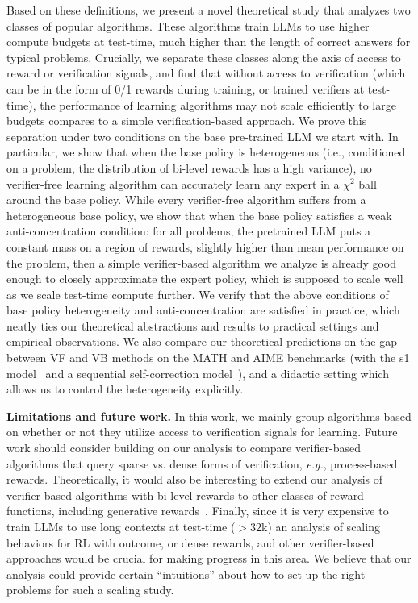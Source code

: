 Based on these definitions, we present a novel theoretical study that analyzes two classes of popular algorithms. These algorithms train LLMs to use higher compute budgets at test-time, much higher than the length of correct answers for typical problems. Crucially, we separate these classes along the axis of access to reward or verification signals, and find that without access to verification (which can be in the form of 0/1 rewards during training, or trained verifiers at test-time), the performance of learning algorithms may not scale efficiently to large budgets compares to a simple verification-based approach. We prove this separation under two conditions on the base pre-trained LLM we start with. In particular, we show that when the base policy is heterogeneous (i.e., conditioned on a problem, the distribution of bi-level rewards has a high variance), no verifier-free learning algorithm can accurately learn any expert in a $\chi^2$ ball around the base policy. While every verifier-free algorithm suffers from a heterogeneous base policy, we show that when the base policy satisfies a weak anti-concentration condition: for all problems, the pretrained LLM puts a constant mass on a region of rewards, slightly higher than mean performance on the problem, then a simple verifier-based algorithm we analyze is already good enough to closely approximate the expert policy, which is supposed to scale well as we scale test-time compute further. We verify that the above conditions of base policy heterogeneity and anti-concentration are satisfied in practice, which neatly ties our theoretical abstractions and results to practical settings and empirical observations. We also  compare our theoretical predictions on the gap between VF and VB methods on the MATH and AIME benchmarks (with the s1 model~\citep{muennighoff2025s1} and a sequential self-correction model~\cite{snell2024scaling}), and a didactic setting which allows us to control the heterogeneity explicitly.

\textbf{Limitations and future work.} In this work, we mainly group algorithms based on whether or not they utilize access to verification signals for learning. Future work should consider building on our analysis to compare verifier-based algorithms that query sparse vs. dense forms of verification, \textit{e.g.}, process-based rewards. Theoretically, it would also be interesting to extend our analysis of verifier-based algorithms with bi-level rewards to other classes of reward functions, including generative rewards~\citep{zhang2024generative}. Finally, since it is very expensive to train LLMs to use long contexts at test-time ($>32$k) an analysis of scaling behaviors for RL with outcome, or dense rewards, and other verifier-based approaches would be crucial for making progress in this area. We believe that our analysis could provide certain ``intuitions'' about how to set up the right problems for such a scaling study.


